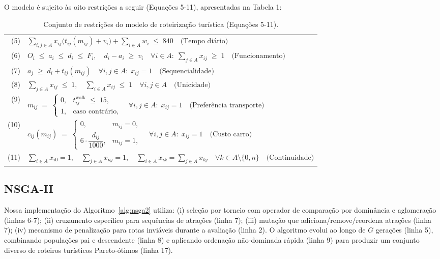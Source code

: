 \documentclass{pssbmac}
\begin{document}
\vspace{1em}
O modelo é sujeito às oito restrições a seguir (Equações 5-11), apresentadas na Tabela 1:
\begin{table}[ht]
\scriptsize
\caption{Conjunto de restrições do modelo de roteirização turística (Equações 5-11).}
\label{tab:constraints}
\begin{flushleft}
\begin{tabular}{@{}rl@{}}
\toprule
(5) &
$\displaystyle
\sum_{i,j \in A} x_{ij}\bigl(t_{ij}(m_{ij}) + v_i\bigr) + \sum_{i\in A} w_i \;\leq\; 840 
\quad\text{(Tempo diário)}$
\\[3pt]
(6) &
$\displaystyle
O_i \;\leq\; a_i \;\leq\; d_i \;\leq\; F_i,\quad 
d_i - a_i \;\geq\; v_i 
\quad \forall i \in A:\; \sum_{j \in A} x_{ij} \;\geq\; 1 
\quad\text{(Funcionamento)}$
\\[3pt]
(7) &
$\displaystyle
a_j \;\geq\; d_i + t_{ij}(m_{ij})
\quad \forall i,j \in A:\; x_{ij}=1
\quad\text{(Sequencialidade)}$
\\[3pt]
(8) &
$\displaystyle
\sum_{j \in A} x_{ij} \;\leq\; 1, 
\quad
\sum_{i \in A} x_{ij} \;\leq\; 1
\quad \forall i,j \in A
\quad\text{(Unicidade)}$
\\[3pt]
(9) &
$\displaystyle
m_{ij} \;=\;
\begin{cases}
0, & t_{ij}^{\text{walk}}\;\leq\; 15,\\
1, & \text{caso contrário},
\end{cases}
\quad \forall i,j \in A:\; x_{ij}=1
\quad\text{(Preferência transporte)}$
\\[5pt]
(10) &
$\displaystyle
c_{ij}(m_{ij}) \;=\;
\begin{cases}
0, & m_{ij}=0,\\
6 \cdot \dfrac{d_{ij}}{1000}, & m_{ij}=1,
\end{cases}
\quad \forall i,j \in A:\; x_{ij}=1
\quad\text{(Custo carro)}$
\\[5pt]
(11) &
$\displaystyle
\sum_{i \in A} x_{i0}=1,\quad 
\sum_{j \in A} x_{nj}=1,\quad 
\sum_{i \in A} x_{ik}=\sum_{j \in A} x_{kj}
\quad \forall k \in A\setminus\{0,n\}
\quad\text{(Continuidade)}$
\\
\bottomrule
\end{tabular}
\end{flushleft}
\end{table}




\subsection{NSGA-II}
Nossa implementação do Algoritmo~\ref{alg:nsga2} utiliza: (i) seleção por torneio com operador de comparação por dominância e aglomeração (linhas 6-7); (ii) cruzamento específico para sequências de atrações (linha 7); (iii) mutação que adiciona/remove/reordena atrações (linha 7); (iv) mecanismo de penalização para rotas inviáveis durante a avaliação (linha 2). O algoritmo evolui ao longo de $G$ gerações (linha 5), combinando populações pai e descendente (linha 8) e aplicando ordenação não-dominada rápida (linha 9) para produzir um conjunto diverso de roteiros turísticos Pareto-ótimos (linha 17).
\end{document}
